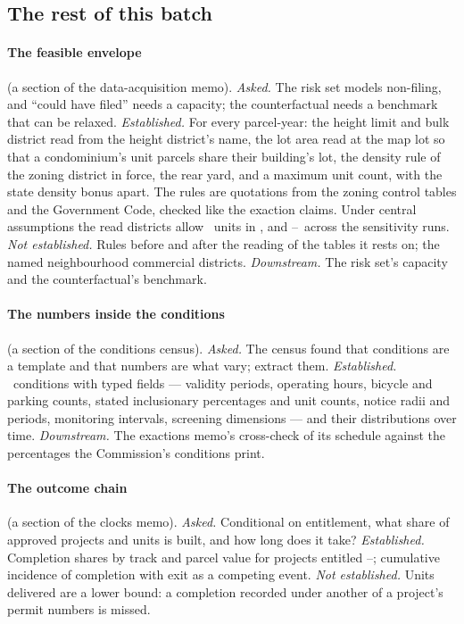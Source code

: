 \documentclass[11pt]{article}
\begin{document}
\subsection{The rest of this batch}\label{sec:chbatch}

\paragraph{The feasible envelope} (a section of the data-acquisition memo). \textit{Asked.} The
risk set models non-filing, and ``could have filed'' needs a capacity; the counterfactual needs
a benchmark that can be relaxed. \textit{Established.} For every parcel-year: the height limit
and bulk district read from the height district's name, the lot area read at the map lot so that
a condominium's unit parcels share their building's lot, the density rule of the zoning district
in force, the rear yard, and a maximum unit count, with the state density bonus apart. The rules
are quotations from the zoning control tables and the Government Code, checked like the
exaction claims. Under central assumptions the read districts allow \envUnitsTotal\ units in
\envYearLast, and \envSensLo--\envSensHi\ across the sensitivity runs. \textit{Not established.}
Rules before and after the reading of the tables it rests on; the named neighbourhood commercial
districts. \textit{Downstream.} The risk set's capacity and the counterfactual's benchmark.

\paragraph{The numbers inside the conditions} (a section of the conditions census).
\textit{Asked.} The census found that conditions are a template and that numbers are what vary;
extract them. \textit{Established.} \chRowsNumeric\ conditions with typed fields --- validity
periods, operating hours, bicycle and parking counts, stated inclusionary percentages and unit
counts, notice radii and periods, monitoring intervals, screening dimensions --- and their
distributions over time. \textit{Downstream.} The exactions memo's cross-check of its schedule
against the percentages the Commission's conditions print.

\paragraph{The outcome chain} (a section of the clocks memo). \textit{Asked.} Conditional on
entitlement, what share of approved projects and units is built, and how long does it take?
\textit{Established.} Completion shares by track and parcel value for projects entitled
\ocMatureFrom--\ocMatureTo; cumulative incidence of completion with exit as a competing event.
\textit{Not established.} Units delivered are a lower bound: a completion recorded under another of
a project's permit numbers is missed.
\end{document}
